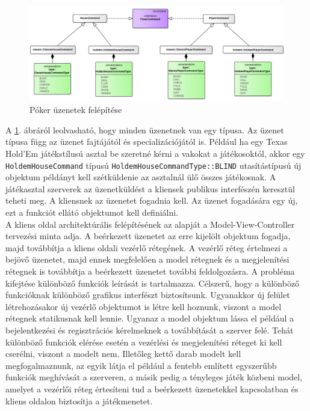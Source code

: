 \begin{figure}[h!]
	\caption{Póker üzenetek felépítése}
	\label{fig:messaging}
	\centering
	\includegraphics[width=\linewidth]{developer-documentation/images/messaging.png}
\end{figure}
A \ref{fig:messaging}. ábráról leolvasható, hogy minden üzenetnek van egy típusa. Az üzenet típusa függ az üzenet fajtájától és specializációjától is. Például ha egy Texas Hold'Em játékstílusú asztal be szeretné kérni a vakokat a játékosoktól, akkor egy \texttt{HoldemHouseCommand} típusú \texttt{HoldemHouseCommandType::BLIND} utasítástípusú új objektum példányt kell szétküldenie az asztalnál ülő összes játékosnak. A játékasztal szerverek az üzenetküldést a kliensek publikus interfészén keresztül teheti meg. A kliensnek az üzenetet fogadnia kell. Az üzenet fogadására egy új, ezt a funkciót ellátó objektumot kell definiálni. \\
A kliens oldal architektúrális felépítésének az alapját a Model-View-Controller tervezési minta adja. A beérkezett üzenetet az erre kijelölt objektum fogadja, majd továbbítja a kliens oldali vezérlő rétegének. A vezérlő réteg értelmezi a bejövő üzenetet, majd ennek megfelelően a model rétegnek és a megjelenítési rétegnek is továbbítja a beérkezett üzenetet további feldolgozásra. A probléma kifejtése különböző funkciók leírását is tartalmazza. Célszerű, hogy a különböző funkcióknak különböző grafikus interfészt biztosítsunk. Ugyanakkor új felület létrehozásakor új vezérlő objektumot is létre kell hoznunk, viszont a model rétegnek statikusnak kell lennie. Ugyanaz a model objektum lássa el például a bejelentkezési és regisztrációs kérelmeknek a továbbítását a szerver felé. Tehát különböző funkciók elérése esetén a vezérlési és megjelenítési réteget ki kell cserélni, viszont a modelt nem. Illetőleg kettő darab modelt kell megfogalmaznunk, az egyik látja el például a fentebb említett egyszerűbb funkciók meghívását a szerveren, a másik pedig a tényleges játék közbeni model, amelyet a vezérlői réteg értesíteni tud a beérkezett üzenetekkel kapcsolatban és kliens oldalon biztosítja a játékmenetet.  \\
